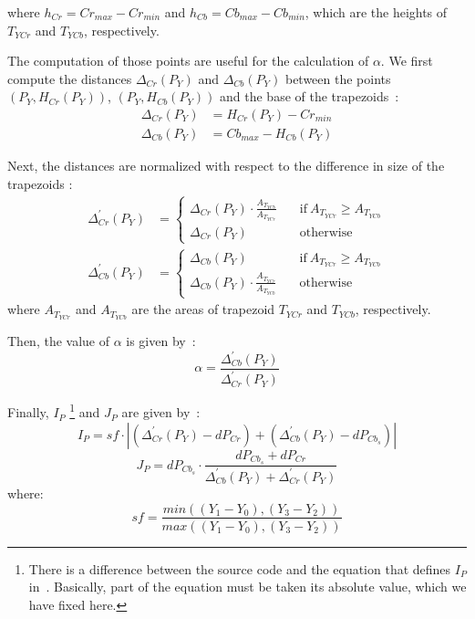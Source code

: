 \noindent where $h_{Cr} = Cr_{max} - Cr_{min}$ and $h_{Cb} = Cb_{max} - Cb_{min}$, which are the heights of $T_{YCr}$ and $T_{YCb}$, respectively.

The computation of those points are useful for the calculation of $\alpha$. We first compute the distances $\Delta_{Cr}(P_Y)$ and $\Delta_{Cb}(P_Y)$ between the points $(P_Y, H_{Cr}(P_Y))$, $(P_Y, H_{Cb}(P_Y))$ and the base of the trapezoids~\citep{brancati:17}:
\begin{align}
    \Delta_{Cr}(P_Y) &= H_{Cr}(P_Y) - Cr_{min} \\
    \Delta_{Cb}(P_Y) &= Cb_{max} - H_{Cb}(P_Y)
\end{align}

Next, the distances are normalized with respect to the difference in size of the trapezoids \citep{brancati:17}:
\begin{align}
  \Delta^{'}_{Cr}(P_Y) &=  \begin{cases}
                \Delta_{Cr}(P_Y) \cdot \frac{A_{T_{YCb}}} {A_{T_{YCr}}} &\quad \text{if}\ A_{T_{YCr}} \geq A_{T_{YCb}} \\
                \Delta_{Cr}(P_Y) &\quad \text{otherwise}
              \end{cases}
\\
  \Delta^{'}_{Cb}(P_Y) &=  \begin{cases}
                \Delta_{Cb}(P_Y) &\quad \text{if}\ A_{T_{YCr}} \geq A_{T_{YCb}} \\
                \Delta_{Cb}(P_Y) \cdot \frac{A_{T_{YCr}}} {A_{T_{YCb}}} &\quad \text{otherwise}
              \end{cases}
\end{align}
where $A_{T_{YCr}}$ and $A_{T_{YCb}}$ are the areas of trapezoid ${T_{YCr}}$ and ${T_{YCb}}$, respectively.

Then, the value of $\alpha$ is given by~\citep{brancati:17}:
\begin{equation}
    \alpha = \frac{\Delta^{'}_{Cb}(P_Y)} {\Delta^{'}_{Cr}(P_Y)}
\end{equation}

Finally, $I_P$ \footnote{There is a difference between the source code and the equation that defines $I_P$ in~\citet{brancati:17}. Basically, part of the equation must be taken its absolute value, which we have fixed here.} and $J_P$ are given by~\citep{brancati:17}:
\begin{equation}
    I_P = sf \cdot |(\Delta^{'}_{Cr}(P_Y) - dP_{Cr}) + (\Delta^{'}_{Cb}(P_Y) - dP_{Cb_s})|
    \label{eq:ip}
\end{equation}
\begin{equation}
    J_P = dP_{Cb_s} \cdot \frac{dP_{Cb_s} + dP_{Cr}} {\Delta^{'}_{Cb}(P_Y) + \Delta^{'}_{Cr}(P_Y)}
    \label{eq:jp}
\end{equation}
where:
\begin{equation}
    sf = \frac{min( (Y_1 - Y_0), (Y_3 - Y_2) )} {max( (Y_1 - Y_0), (Y_3 - Y_2) )}
\end{equation}

